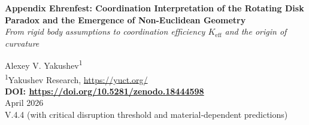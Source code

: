 \documentclass[12pt,a4paper]{article}
\begin{document}
	
	\begin{titlepage}
		\begin{center}
			\vspace*{1cm}
			\Huge\textbf{Appendix Ehrenfest: Coordination Interpretation of the Rotating Disk Paradox and the Emergence of Non-Euclidean Geometry} \\
			\vspace{0.5cm}
			\Large\textit{From rigid body assumptions to coordination efficiency \(K_{\mathrm{eff}}\) and the origin of curvature}
			\vspace{1.5cm}
			
			\Large Alexey V. Yakushev\textsuperscript{1} \\
			\vspace{0.3cm}
			\large \textsuperscript{1}Yakushev Research, \url{https://yuct.org/} \\
			\vspace{1cm}
			\textbf{DOI: \url{https://doi.org/10.5281/zenodo.18444598}} \\
			\vspace{1cm}
			April 2026 \\ \large V.4.4 (with critical disruption threshold and material‑dependent predictions)
			\vspace{2cm}
			

\end{center}
\end{titlepage}
\end{document}
